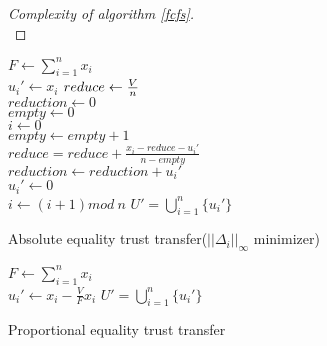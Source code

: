 \documentclass[11pt]{article}
\theoremstyle{definition}
\theoremstyle{corollary}
\begin{document}
    \begin{proof}[Complexity of algorithm \ref{fcfs}] \ \\
    \end{proof}

    \begin{algorithm}[H]
       $F \gets \sum\limits_{i=1}^{n}x_i$ \\
          {$u_i' \gets x_i$}
       $reduce \gets {V \over n}$ \\
       $reduction \gets 0$ \\
       $empty \gets 0$ \\
       $i \gets 0$ \\
          {
                {$empty \gets empty + 1$ \\
                 $reduce = reduce + \frac{x_i - reduce -u_i'}{n - empty}$ \\
                 $reduction \gets reduction + u_i'$ \\
                 $u_i' \gets 0$ \\}
           $i \gets (i + 1) mod \:n$}
       \Return $U' = \bigcup\limits_{i=1}^{n}\{u_i'\}$
       \caption{Absolute equality trust transfer($||\Delta_i||_\infty$ minimizer)}
    \end{algorithm}

    \begin{algorithm}[H]
       $F \gets \sum\limits_{i=1}^{n}x_i$ \\
          {$u_i' \gets x_i - \frac{V}{F} x_i$}
       \Return $U' = \bigcup\limits_{i=1}^{n}\{u_i'\}$
       \caption{Proportional equality trust transfer}
    \end{algorithm} \ \\
\end{document}
